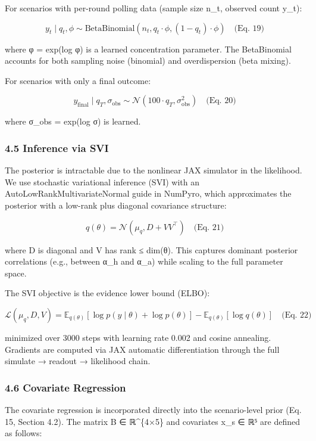 \documentclass[
]{article}
\begin{document}
For scenarios with per-round polling data (sample size n\_t, observed
count y\_t):

\[y_t \mid q_t, \phi \sim \text{BetaBinomial}(n_t, q_t \cdot \phi, (1 - q_t) \cdot \phi) \quad \text{(Eq. 19)}\]

where φ = exp(log φ) is a learned concentration parameter. The
BetaBinomial accounts for both sampling noise (binomial) and
overdispersion (beta mixing).

For scenarios with only a final outcome:

\[y_{\text{final}} \mid q_T, \sigma_{\text{obs}} \sim \mathcal{N}(100 \cdot q_T, \sigma_{\text{obs}}^2) \quad \text{(Eq. 20)}\]

where σ\_obs = exp(log σ) is learned.

\subsubsection{4.5 Inference via SVI}\label{inference-via-svi}

The posterior is intractable due to the nonlinear JAX simulator in the
likelihood. We use stochastic variational inference (SVI) with an
AutoLowRankMultivariateNormal guide in NumPyro, which approximates the
posterior with a low-rank plus diagonal covariance structure:

\[q(\theta) = \mathcal{N}(\mu_q, D + VV^\top) \quad \text{(Eq. 21)}\]

where D is diagonal and V has rank ≤ dim(θ). This captures dominant
posterior correlations (e.g., between α\_h and α\_a) while scaling to
the full parameter space.

The SVI objective is the evidence lower bound (ELBO):

\[\mathcal{L}(\mu_q, D, V) = \mathbb{E}_{q(\theta)}[\log p(y \mid \theta) + \log p(\theta)] - \mathbb{E}_{q(\theta)}[\log q(\theta)] \quad \text{(Eq. 22)}\]

minimized over 3000 steps with learning rate 0.002 and cosine annealing.
Gradients are computed via JAX automatic differentiation through the
full simulate → readout → likelihood chain.

\subsubsection{4.6 Covariate Regression}\label{covariate-regression}

The covariate regression is incorporated directly into the
scenario-level prior (Eq. 15, Section 4.2). The matrix B ∈ ℝ\^{}\{4×5\}
and covariates x\_s ∈ ℝ⁵ are defined as follows:
\end{document}
